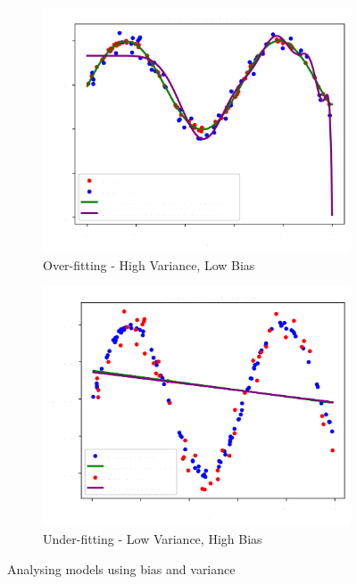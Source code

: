 \begin{figure}[H]
  \centering
  \begin{subfigure}{.4\textwidth}
    \centering
    \includegraphics[width=\linewidth]{images/14.png}
    \caption{Over-fitting - High Variance, Low Bias}
  \end{subfigure}%
  \begin{subfigure}{.4\textwidth}
    \centering
    \includegraphics[width=\linewidth]{images/15.png}
    \caption{Under-fitting - Low Variance, High Bias}
  \end{subfigure}
  \caption{Analysing models using bias and variance}
\end{figure}

